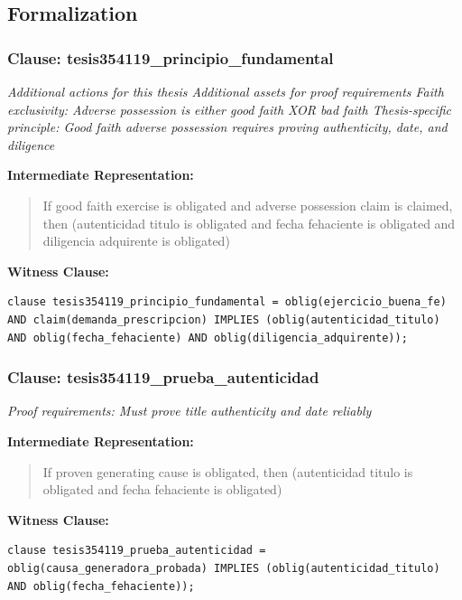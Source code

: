 \documentclass[11pt,a4paper]{article}
\begin{document}
\subsection{Formalization}

\subsubsection{Clause: tesis354119\_principio\_fundamental}

\textit{Additional actions for this thesis Additional assets for proof requirements Faith exclusivity: Adverse possession is either good faith XOR bad faith Thesis-specific principle: Good faith adverse possession requires proving authenticity, date, and diligence}

\textbf{Intermediate Representation:}

\begin{quote}
If good faith exercise is obligated and adverse possession claim is claimed, then (autenticidad titulo is obligated and fecha fehaciente is obligated and diligencia adquirente is obligated)
\end{quote}

\textbf{Witness Clause:}

\begin{lstlisting}[style=witnessstyle, language=Witness]
clause tesis354119_principio_fundamental = oblig(ejercicio_buena_fe) AND claim(demanda_prescripcion) IMPLIES (oblig(autenticidad_titulo) AND oblig(fecha_fehaciente) AND oblig(diligencia_adquirente));
\end{lstlisting}

\subsubsection{Clause: tesis354119\_prueba\_autenticidad}

\textit{Proof requirements: Must prove title authenticity and date reliably}

\textbf{Intermediate Representation:}

\begin{quote}
If proven generating cause is obligated, then (autenticidad titulo is obligated and fecha fehaciente is obligated)
\end{quote}

\textbf{Witness Clause:}

\begin{lstlisting}[style=witnessstyle, language=Witness]
clause tesis354119_prueba_autenticidad = oblig(causa_generadora_probada) IMPLIES (oblig(autenticidad_titulo) AND oblig(fecha_fehaciente));
\end{lstlisting}
\end{document}
